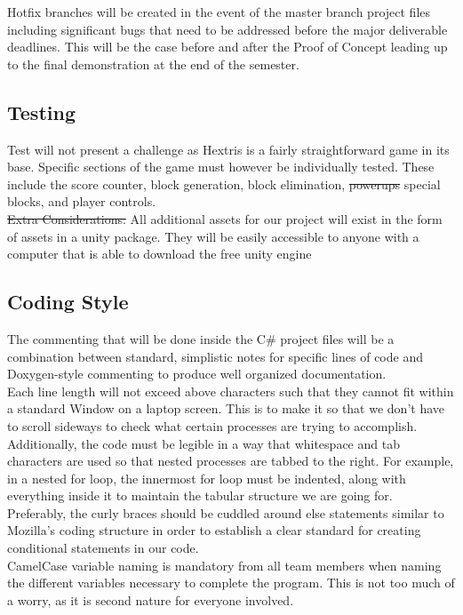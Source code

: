 \documentclass[12pt]{article}
\begin{document}
Hotfix branches will be created in the event of the master branch project files including significant bugs that need to be addressed before the major deliverable deadlines. This will be the case before and after the Proof of Concept leading up to the final demonstration at the end of the semester. \\


\subsection{Testing}
Test will not present a challenge as Hextris is a fairly straightforward game in its base. Specific sections of the game must however be individually tested. These include the score counter, block generation, block elimination, \sout{powerups} {\color{blue}special blocks}, and player controls.\\

\sout{Extra Considerations:} All additional assets for our project will exist in the form of assets in a unity package. They will be easily accessible to anyone with a computer that is able to download the free unity engine 

\subsection{Coding Style}
The commenting that will be done inside the C\# project files will be a combination between standard, simplistic notes for specific lines of code and Doxygen-style commenting to produce well organized documentation.\\

Each line length will not exceed above characters such that they cannot fit within a standard Window on a laptop screen. This is to make it so that we don't have to scroll sideways to check what certain processes are trying to accomplish. Additionally, the code must be legible in a way that whitespace and tab characters are used so that nested processes are tabbed to the right. For example, in a nested for loop, the innermost for loop must be indented, along with everything inside it to maintain the tabular structure we are going for. \\

Preferably, the curly braces should be cuddled around else statements similar to Mozilla's coding structure in order to establish a clear standard for creating conditional statements in our code. \\

	CamelCase variable naming is mandatory from all team members when naming the different variables necessary to complete the program. This is not too much of a worry, as it is second nature for everyone involved. \\
	
\end{document}
